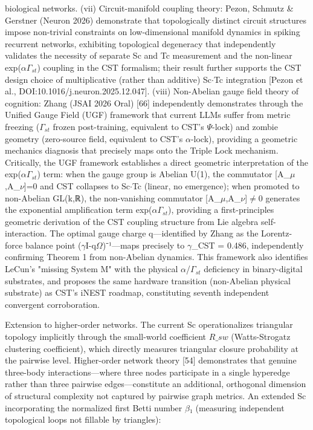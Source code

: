 \documentclass[a4paper,12pt]{article}
\begin{document}
biological networks. (vii) Circuit-manifold coupling theory: Pezon, Schmutz & Gerstner (Neuron 2026) demonstrate that topologically distinct circuit structures impose non-trivial constraints on low-dimensional manifold dynamics in spiking recurrent networks, exhibiting topological degeneracy that independently validates the necessity of separate Sc and Tc measurement and the non-linear
exp($\alpha$\cdot$\Gamma_{st}$) coupling in the CST formalism; their result further supports the CST design choice of multiplicative (rather than additive) Sc$\cdot$Tc integration [Pezon et al., DOI:10.1016/j.neuron.2025.12.047]. (viii) Non-Abelian gauge field theory of cognition: Zhang (JSAI 2026 Oral) [66] independently demonstrates through the Unified Gauge Field (UGF) framework that current
LLMs suffer from metric freezing ($\Gamma_{st}$ frozen post-training, equivalent to CST's $\Psi$-lock) and zombie geometry (zero-source field, equivalent to CST's $\alpha$-lock), providing a geometric mechanics diagnosis that precisely maps onto the Triple Lock mechanism.
Critically, the UGF framework establishes a direct geometric interpretation of the exp($\alpha$\cdot$\Gamma_{st}$) term: when the gauge group is Abelian U(1), the commutator [A_$\mu$,A_$\nu$]=0 and CST collapses to Sc$\cdot$Tc (linear, no emergence); when promoted to non-Abelian GL(k,ℝ), the non-vanishing commutator [A_$\mu$,A_$\nu$]$\neq$0 generates the exponential amplification term
exp($\alpha$\cdot$\Gamma_{st}$), providing a first-principles geometric derivation of the CST coupling structure from Lie algebra self-interaction.
The optimal gauge charge q---identified by Zhang as the Lorentz-force balance point ($\gamma$I-q$\Omega$)⁻¹---maps precisely to $\gamma$_CST = 0.486, independently confirming Theorem 1 from non-Abelian dynamics.
This framework also identifies LeCun's "missing System M" with the physical $\alpha$/$\Gamma_{st}$ deficiency in binary-digital substrates, and proposes the same hardware transition (non-Abelian physical substrate) as CST's iNEST roadmap, constituting seventh independent convergent corroboration.


Extension to higher-order networks.
The current Sc operationalizes triangular topology implicitly through the small-world coefficient $R\_{sw}$ (Watts-Strogatz clustering coefficient), which directly measures triangular closure probability at the pairwise level.
Higher-order network theory [54] demonstrates that genuine three-body interactions---where three nodes participate in a single hyperedge rather than three pairwise edges---constitute an additional, orthogonal dimension of structural complexity not captured by pairwise graph metrics.
An extended Sc incorporating the normalized first Betti number $\beta$₁ (measuring independent topological loops not fillable by triangles):
\end{document}
